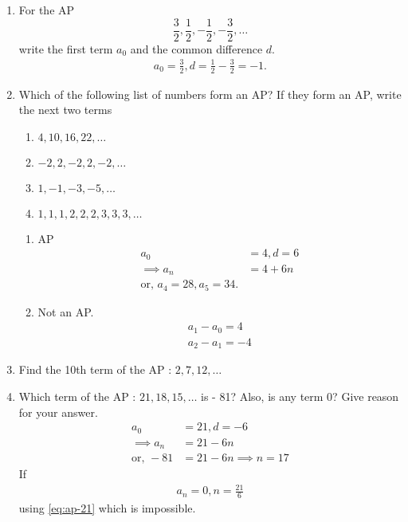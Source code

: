 \begin{enumerate}[label=\thesubsection.\arabic*, ref=\thesubsection.\theenumi]
%
\item For the AP 
$$\frac{3}{2}, \frac{1}{2}, -\frac{1}{2}, -\frac{3}{2}, \dots $$ write the first term $a_0$ and the common difference $d$.
\\
\solution
\begin{align}
	a_0 = \frac{3}{2}, d=  \frac{1}{2}-\frac{3}{2} = -1.
\end{align}
\item Which of the following list of numbers form an AP? If they form an AP, 
write the next two terms 
		\begin{multicols}{2}
\begin{enumerate}
\item $4, 10, 16, 22, \dots$ 
\item $-2, 2, -2, 2, -2, \dots$
\item $1, -1, -3, -5, \dots$ 
\item $1, 1, 1, 2, 2, 2, 3, 3, 3, \dots$
\end{enumerate}
\end{multicols}
\begin{enumerate}
	\item AP
\begin{align}
	a_0 &= 4, d = 6
	\\
	\implies a_n &= 4 +6n
	\\
	\text{or, }a_4 = 28, a_5 = 34.
\end{align}
	\item 
		Not an AP.
\begin{align}
	 a_1-a_0=4
	\\
	 a_2-a_1=-4
\end{align}
\end{enumerate}
\item Find the 10th term of the AP : $2,  7,  12,  \dots$
\item Which term of the AP : $21,  18,  15,  \dots$ is - 81? Also,  is any term 0? Give reason for your answer.
	\\
	\solution
\begin{align}
	a_0 &= 21, d = -6
	\\
	\implies a_n &= 21 -6n
	\label{eq:ap-21}
	\\
	\text{or, }-81 &=21-6n \implies n = 17
\end{align}
If
\begin{align}
	a_n = 0, 
 n= \frac{21}{6}
\end{align}
	using \eqref{eq:ap-21} which is impossible.

\end{enumerate}
